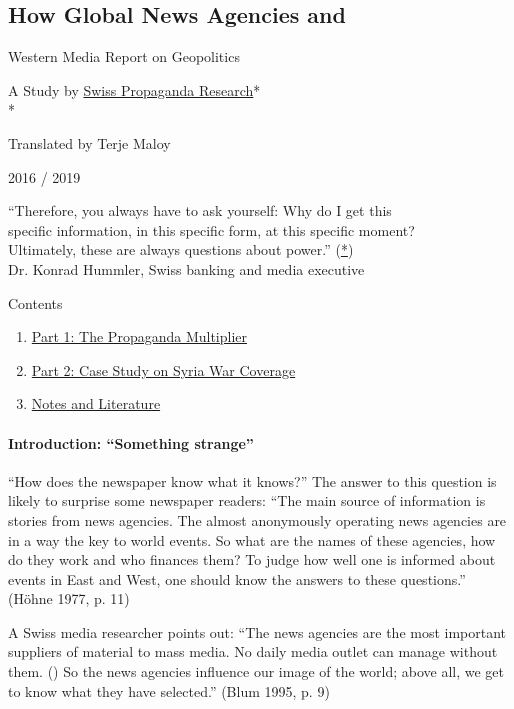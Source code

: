 \hypertarget{how-global-news-agencies-and}{%
\subsection{How Global News Agencies
and}\label{how-global-news-agencies-and}}

Western Media Report on Geopolitics

A Study by \href{https://swprs.org/contact/}{Swiss Propaganda
Research}*\\
*

Translated by Terje Maloy

2016 / 2019

``Therefore, you always have to ask yourself: Why do I get this\\
specific information, in this specific form, at this specific moment?\\
Ultimately, these are always questions about power.''
(\href{http://www.nzz.ch/wer-lustvoll-schreibt-der-schreibt-auch-gut-1.11329756}{*})\\
Dr. Konrad Hummler, Swiss banking and media executive

Contents

\begin{enumerate}
\def\labelenumi{\arabic{enumi}.}
\tightlist
\item
  \protect\hyperlink{k1}{Part 1: The Propaganda Multiplier}
\item
  \protect\hyperlink{k2}{Part 2: Case Study on Syria War Coverage}
\item
  \protect\hyperlink{k3}{Notes and Literature}
\end{enumerate}

\hypertarget{introduction-something-strange}{%
\paragraph{Introduction: ``Something
strange''}\label{introduction-something-strange}}

``How does the newspaper know what it knows?'' The answer to this
question is likely to surprise some newspaper readers: ``The main source
of information is stories from news agencies. The almost anonymously
operating news agencies are in a way the key to world events. So what
are the names of these agencies, how do they work and who finances them?
To judge how well one is informed about events in East and West, one
should know the answers to these questions.'' (Höhne 1977, p. 11)

A Swiss media researcher points out: ``The news agencies are the most
important suppliers of material to mass media. No daily media outlet can
manage without them. () So the news agencies influence our image of the
world; above all, we get to know what they have selected.'' (Blum 1995,
p. 9)

